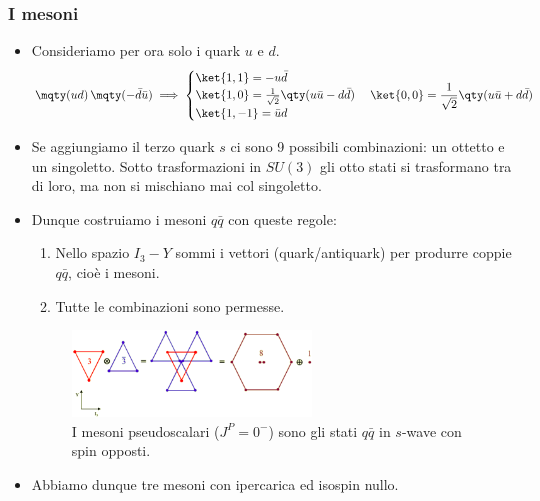 \subsubsection{I mesoni}
\begin{itemize}
    \item Consideriamo per ora solo i quark $u$ e $d$.
    \begin{equation*}
    \mqty(u\\d)\,\mqty(-\bar d\\ \bar u)\implies 
    \begin{cases}
    \ket{1,1}=-u\bar d\\
    \ket{1,0}=\frac1{\sqrt2}\qty(u\bar u-d\bar d)\\
    \ket{1,-1}=\bar ud
    \end{cases}\\
    \ket{0,0}=\frac1{\sqrt2}\qty(u\bar u+d\bar d)
    \end{equation*}
    \item Se aggiungiamo il terzo quark $s$ ci sono 9 possibili combinazioni: un ottetto e un singoletto. Sotto trasformazioni in $SU(3)$ gli otto stati si trasformano tra di loro, ma non si mischiano mai col singoletto.
    \item Dunque costruiamo i mesoni $q\bar q$ con queste regole:
    \begin{enumerate}
    \item Nello spazio $I_3-Y$ sommi i vettori (quark/antiquark) per produrre coppie $q\bar q$, cioè i mesoni.
    \item Tutte le combinazioni sono permesse.
    \end{enumerate}
    \begin{figure}[H]
        \centering
        \includegraphics[width=0.6\textwidth]{immagini/fig_mix_meson.png}
        \caption{I mesoni pseudoscalari ($J^P=0^-$) sono gli stati $q\bar q$ in $s$-wave con spin opposti.}
      \end{figure}
      \item Abbiamo dunque tre mesoni con ipercarica ed isospin nullo. 
\end{itemize}
